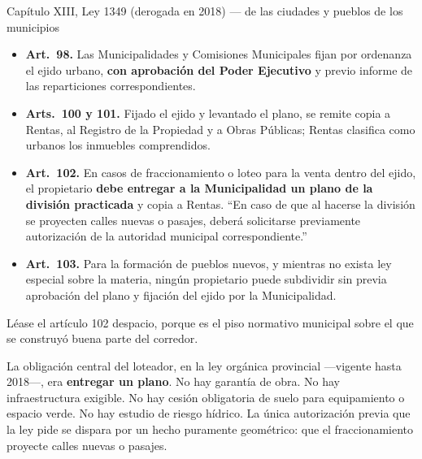 \begin{ficha}{Capítulo XIII, Ley 1349 (derogada en 2018) --- de las ciudades y pueblos de los municipios}
\begin{itemize}[leftmargin=*,nosep]
\item \textbf{Art.\ 98.} Las Municipalidades y Comisiones Municipales fijan por ordenanza el ejido urbano, \textbf{con aprobación del Poder Ejecutivo} y previo informe de las reparticiones correspondientes.
\item \textbf{Arts.\ 100 y 101.} Fijado el ejido y levantado el plano, se remite copia a Rentas, al Registro de la Propiedad y a Obras Públicas; Rentas clasifica como urbanos los inmuebles comprendidos.
\item \textbf{Art.\ 102.} En casos de fraccionamiento o loteo para la venta dentro del ejido, el propietario \textbf{debe entregar a la Municipalidad un plano de la división practicada} y copia a Rentas. ``En caso de que al hacerse la división se proyecten calles nuevas o pasajes, deberá solicitarse previamente autorización de la autoridad municipal correspondiente.''
\item \textbf{Art.\ 103.} Para la formación de pueblos nuevos, y mientras no exista ley especial sobre la materia, ningún propietario puede subdividir sin previa aprobación del plano y fijación del ejido por la Municipalidad.
\end{itemize}
\end{ficha}

Léase el artículo 102 despacio, porque es el piso normativo municipal sobre el que se construyó buena parte del corredor.

La obligación central del loteador, en la ley orgánica provincial ---vigente hasta 2018---, era \textbf{entregar un plano}. No hay garantía de obra. No hay infraestructura exigible. No hay cesión obligatoria de suelo para equipamiento o espacio verde. No hay estudio de riesgo hídrico. La única autorización previa que la ley pide se dispara por un hecho puramente geométrico: que el fraccionamiento proyecte calles nuevas o pasajes.

